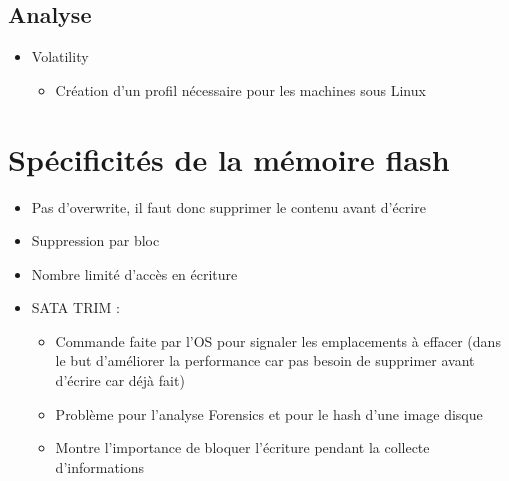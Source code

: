 \documentclass[a4paper]{article}
\begin{document}
\subsection{Analyse}
\begin{itemize}
    \item Volatility
    \begin{itemize}
        \item Création d'un profil nécessaire pour les machines sous Linux
    \end{itemize}
\end{itemize}
\newpage
\section{Spécificités de la mémoire flash}
\begin{itemize}
    \item Pas d'overwrite, il faut donc supprimer le contenu avant d'écrire
    \item Suppression par bloc
    \item Nombre limité d'accès en écriture
    \item SATA TRIM :
    \begin{itemize}
        \item Commande faite par l'OS pour signaler les emplacements à effacer (dans le but d'améliorer la performance car pas besoin de supprimer avant d'écrire car déjà fait)
        \item Problème pour l'analyse Forensics et pour le hash d'une image disque
        \item Montre l'importance de bloquer l'écriture pendant la collecte d'informations
    \end{itemize}
\end{itemize}
\end{document}
